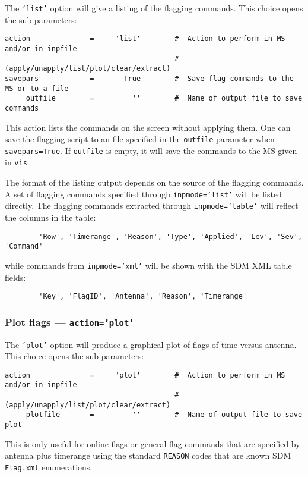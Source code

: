 The {\tt 'list'} option will give a listing of the flagging commands.
This choice opens the sub-parameters:
\small
\begin{verbatim}
action              =     'list'        #  Action to perform in MS and/or in inpfile
                                        # (apply/unapply/list/plot/clear/extract)
savepars            =       True        #  Save flag commands to the MS or to a file
     outfile        =         ''        #  Name of output file to save commands
\end{verbatim}
\normalsize

This action lists the commands on the screen without applying
them. One can save the flagging script to an file specified in the
{\tt outfile} parameter when {\tt savepars=True}. If {\tt outfile} is
empty, it will save the commands to the MS given in {\tt vis}.



The format of the listing output depends on the source of the flagging
commands. A set of flagging commands specified through 
{\tt inpmode='list'} will be listed directly. The
flagging commands extracted through {\tt inpmode='table'} will
reflect the columns in the table:
\begin{verbatim}
        'Row', 'Timerange', 'Reason', 'Type', 'Applied', 'Lev', 'Sev', 'Command'
\end{verbatim}
while commands from {\tt inpmode='xml'} will be shown with the SDM
XML table fields:
\begin{verbatim}
        'Key', 'FlagID', 'Antenna', 'Reason', 'Timerange'
\end{verbatim}



\subsubsection{Plot flags --- {\tt action='plot'}}
\label{section:edit.flagcmd.action.plot}

The {\tt 'plot'} option will produce a graphical plot of flags of time versus antenna.
This choice opens the sub-parameters:
\small
\begin{verbatim}
action              =     'plot'        #  Action to perform in MS and/or in inpfile
                                        #   (apply/unapply/list/plot/clear/extract)
     plotfile       =         ''        #  Name of output file to save plot
\end{verbatim}
\normalsize
This is only useful for online flags or general flag commands that are
specified by antenna plus timerange using the standard {\tt REASON}
codes that are known SDM {\tt Flag.xml} enumerations.

